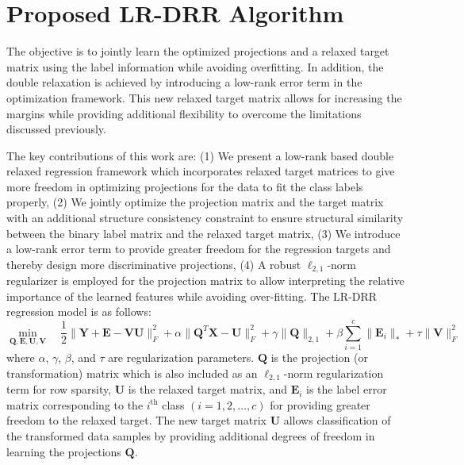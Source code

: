 \section{Proposed LR-DRR Algorithm}
%
The objective is to jointly learn the optimized projections and a relaxed target matrix using the label information while avoiding overfitting. In addition, the double relaxation is achieved by introducing a low-rank error term in the optimization framework. This new relaxed target matrix allows for increasing the margins while providing additional flexibility to overcome the limitations discussed previously. 

The key contributions of this work are: (1) We present a low-rank based double relaxed regression framework which incorporates relaxed target matrices to give more freedom in optimizing projections for the data to fit the class labels properly, (2) We jointly optimize the projection matrix and the target matrix with an additional structure consistency constraint to ensure structural similarity between the binary label matrix and the relaxed target matrix, (3) We introduce a low-rank error term to provide greater freedom for the regression targets and thereby design more discriminative projections, (4) A robust $\ell_{2,1}$-norm regularizer is employed for the projection matrix to allow interpreting the relative importance of the learned features while avoiding over-fitting. The LR-DRR regression model is as follows:
%
\begin{equation}
    \label{eq: LR-DRR}
        \min_{\mathbf{Q}, \mathbf{E}, \mathbf{U}, \mathbf{V}}  \quad \frac{1}{2} \| \mathbf{Y} + \mathbf{E} - \mathbf{VU}\|_{F}^{2} + \alpha \| \mathbf{Q}^{T} \mathbf{X} - \mathbf{U} \|_{F}^{2} + 
        \gamma \| \mathbf{Q} \|_{2,1} + \beta \sum_{i=1}^{c} \| \mathbf{E}_{i} \|_{*} + \tau \| \mathbf{V}\|_{F}^{2}
\end{equation}
%
where $\alpha$, $\gamma$, $\beta$, and $\tau$ are regularization parameters. $\mathbf{Q}$ is the projection (or transformation) matrix which is also included as an $\ell_{2,1}$-norm regularization term for row sparsity, $\mathbf{U}$ is the relaxed target matrix, and $\mathbf{E}_{i}$ is the label error matrix corresponding to the $i^{\text{th}}$ class $( i = 1, 2, \dots, c)$ for providing greater freedom to the relaxed target. The new target matrix $\mathbf{U}$ allows classification of the transformed data samples by providing additional degrees of freedom in learning the projections $\mathbf{Q}$.

